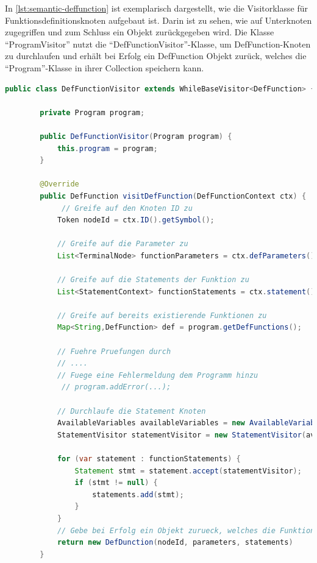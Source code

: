 In \cref{lst:semantic-deffunction} ist exemplarisch dargestellt, wie die Visitorklasse für Funktionsdefinitionsknoten aufgebaut ist. Darin ist zu sehen, wie auf Unterknoten zugegriffen und zum Schluss ein Objekt zurückgegeben wird. Die Klasse \enquote{ProgramVisitor} nutzt die \enquote{DefFunctionVisitor}-Klasse, um DefFunction-Knoten zu durchlaufen und erhält bei Erfolg ein DefFunction Objekt zurück, welches die \enquote{Program}-Klasse in ihrer Collection speichern kann.

\begin{lstlisting}[language=java, caption=Prinzipieller Aufbau einer Visitorklasse, label={lst:semantic-deffunction}]
	public class DefFunctionVisitor extends WhileBaseVisitor<DefFunction> {
		
		private Program program;
		
		public DefFunctionVisitor(Program program) {
			this.program = program;
		}
		
		@Override
		public DefFunction visitDefFunction(DefFunctionContext ctx) {
			 // Greife auf den Knoten ID zu
			Token nodeId = ctx.ID().getSymbol();
			
			// Greife auf die Parameter zu
			List<TerminalNode> functionParameters = ctx.defParameters().ID();
			
			// Greife auf die Statements der Funktion zu
			List<StatementContext> functionStatements = ctx.statement(); 
			
			// Greife auf bereits existierende Funktionen zu
			Map<String,DefFunction> def = program.getDefFunctions();
			
			// Fuehre Pruefungen durch
			// ....
			// Fuege eine Fehlermeldung dem Programm hinzu 
			 // program.addError(...);
			
			// Durchlaufe die Statement Knoten
			AvailableVariables availableVariables = new AvailableVariables();
			StatementVisitor statementVisitor = new StatementVisitor(availableVariables, programm);
			
			for (var statement : functionStatements) {
				Statement stmt = statement.accept(statementVisitor);
				if (stmt != null) {
					statements.add(stmt);
				}
			}
			// Gebe bei Erfolg ein Objekt zurueck, welches die Funktion abbildet
			return new DefDunction(nodeId, parameters, statements)
		}
\end{lstlisting}

